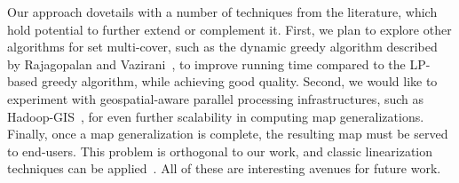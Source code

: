 Our approach dovetails with a number of techniques from the literature, which hold potential to further extend or complement it. First, we plan to explore other algorithms for set multi-cover, such as the dynamic greedy algorithm described by Rajagopalan and Vazirani~\cite{rajagopalan1998primal}, to improve running time compared to the LP-based greedy algorithm, while achieving good quality. Second, we would like to experiment with geospatial-aware parallel processing infrastructures, such as Hadoop-GIS~\cite{Aji:2013:HadoopGIS}, for even further scalability in computing map generalizations. Finally, once a map generalization is complete, the resulting map must be served to end-users. This problem is orthogonal to our work, and classic linearization techniques can be applied~\cite{hilbert1891ueber}. All of these are interesting avenues for future work.

